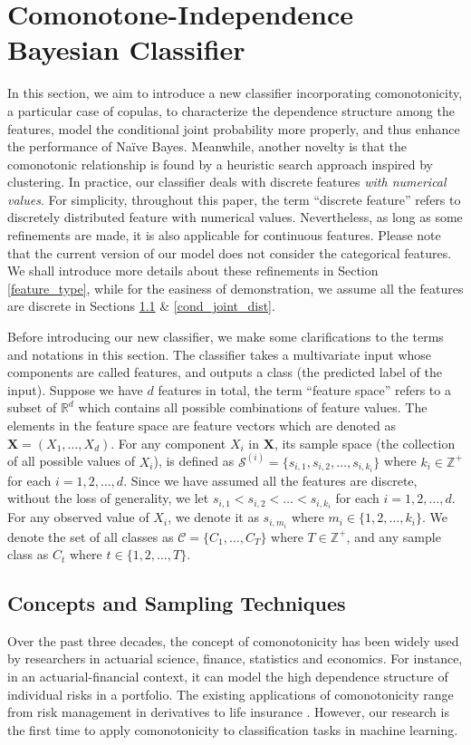 \documentclass[twoside,11pt]{article}
\begin{document}
\section{Comonotone-Independence Bayesian Classifier}\label{ciber}
In this section, we aim to introduce a new classifier incorporating comonotonicity, a particular case of copulas, to characterize the dependence structure among the features, model the conditional joint probability more properly, and thus enhance the performance of Na\"ive Bayes. Meanwhile, another novelty is that the comonotonic relationship is found by a heuristic search approach inspired by clustering. In practice, our classifier deals with discrete features \textit{with numerical values}. For simplicity, throughout this paper, the term ``discrete feature'' refers to discretely distributed feature with numerical values. Nevertheless, as long as some refinements are made, it is also applicable for continuous features. Please note that the current version of our model does not consider the categorical features. We shall introduce more details about these refinements in Section \ref{feature_type}, while for the easiness of demonstration, we assume all the features are discrete in Sections \ref{concepts} \& \ref{cond_joint_dist}.

Before introducing our new classifier, we make some clarifications to the terms and notations in this section. The classifier takes a multivariate input whose components are called features, and outputs a class (the predicted label of the input). Suppose we have $d$ features in total, the term ``feature space'' refers to a subset of $\mathbb{R}^d$ which contains all possible combinations of feature values. The elements in the feature space are feature vectors which are denoted as $\mathbf{X}=(X_1,\dots,X_d)$. For any component $X_i$ in $\mathbf{X}$, its sample space (the collection of all possible values of $X_i$), is defined as $\mathcal{S}^{(i)}=\{s_{i,1},s_{i,2},\dots,s_{i,k_i}\}$ where $k_i\in\mathbb{Z}^+$ for each $i=1,2,\dots,d$. Since we have assumed all the features are discrete, without the loss of generality, we let $s_{i,1}<s_{i,2}<\dots<s_{i,k_i}$ for each $i=1,2,\dots,d$. For any observed value of $X_i$, we denote it as $s_{i,m_i}$ where $m_i\in\{1,2,\dots,k_i\}$. We denote the set of all classes as $\mathcal{C}=\{C_1,\dots,C_T\}$ where $T\in\mathbb{Z}^+$, and any sample class as $C_t$ where $t\in \{1,2,\dots,T\}$.

\subsection{Concepts and Sampling Techniques}\label{concepts}
Over the past three decades, the concept of comonotonicity has been widely used by researchers in actuarial science, finance, statistics and economics. For instance, in an actuarial-financial context, it can model the high dependence structure of individual risks in a portfolio. The existing applications of comonotonicity range from risk management in derivatives to life insurance \citep{deelstra2011overview}. However, our research is the first time to apply comonotonicity to classification tasks in machine learning.
\end{document}

